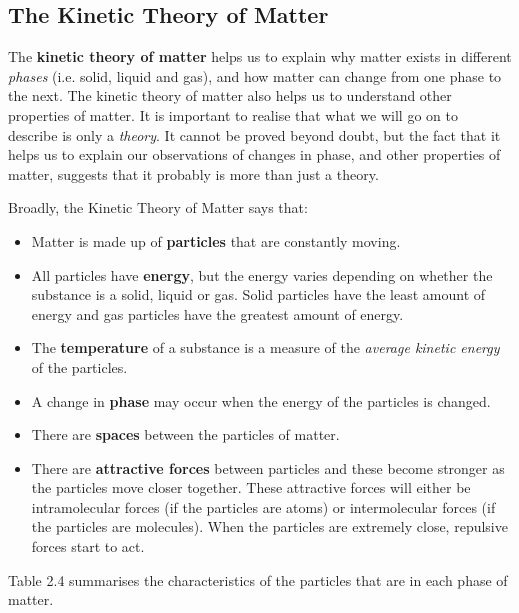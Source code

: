             \subsection{ The Kinetic Theory of Matter}
            \nopagebreak
      \label{m38730*id308618}The \textbf{kinetic theory of 
matter} helps us to explain why matter exists in different \textsl{phases} (i.e. solid, liquid and gas), and how matter 
can change from one phase to the next. The kinetic theory of matter also helps 
us to understand other properties of matter. It is important to realise that 
what we will go on to describe is only a \textsl{theory}. It cannot be proved beyond doubt, but the 
fact that it helps us to explain our observations of changes in phase, and other 
properties of matter, suggests that it probably is more than just a theory.
\par 
      \label{m38730*id308641}Broadly, the Kinetic Theory of Matter says that:
\par 
      \label{m38730*id308647}\begin{itemize}[noitemsep]
            \label{m38730*uid34}\item Matter is made up of \textbf{particles} 
that are constantly moving.
\label{m38730*uid35}\item All particles have \textbf{energy}, but the energy varies depending on whether the 
substance is a solid, liquid or gas. Solid particles have the least amount of 
energy and gas particles have the greatest amount of energy.
\label{m38730*uid36}\item The \textbf{temperature} of a 
substance is a measure of the \textsl{average kinetic 
energy} of the particles.
\label{m38730*uid37}\item A change in \textbf{phase} 
may occur when the energy of the particles is changed.
\label{m38730*uid38}\item There are \textbf{spaces} 
between the particles of matter.
\label{m38730*uid39}\item There are \textbf{attractive 
forces} between particles and these become stronger as the particles 
move closer together. These attractive forces will either be intramolecular 
forces (if the particles are atoms) or intermolecular forces (if the particles 
are molecules). When the particles are extremely close, repulsive forces start 
to act.
\end{itemize}
      \label{m38730*id308767}Table 2.4 summarises the 
characteristics of the particles that are in each phase of matter.\par 

